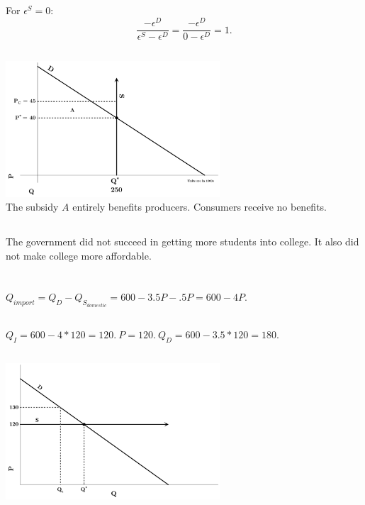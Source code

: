 \documentclass{article}
\begin{document}
	\subsection[f]{}
		For $\epsilon^S = 0$: 
		$$ \frac{-\epsilon^D}{\epsilon^S - \epsilon^D} =  \frac{-\epsilon^D}{0 - \epsilon^D} = 1. $$
	\subsection[g]{}
		\includegraphics[height=2in]{Charts/2g}\\
		The subsidy $A$ entirely benefits producers. Consumers receive no benefits. 
	\subsection[h]{}
		The government did not succeed in getting more students into college. It also did not make college more affordable.
\section[3]{}
	\subsection[a]{}
		$Q_{import} = Q_{D} - Q_{{S}_{domestic}} = 600-3.5P-.5P = 600-4P.$
	\subsection[b]{}
		$Q_I = 600 - 4*120 = 120.~ P=120.~Q_D = 600-3.5*120=180.$
	\subsection[c]{}
		\includegraphics[height=2in]{Charts/3c}
\end{document}
